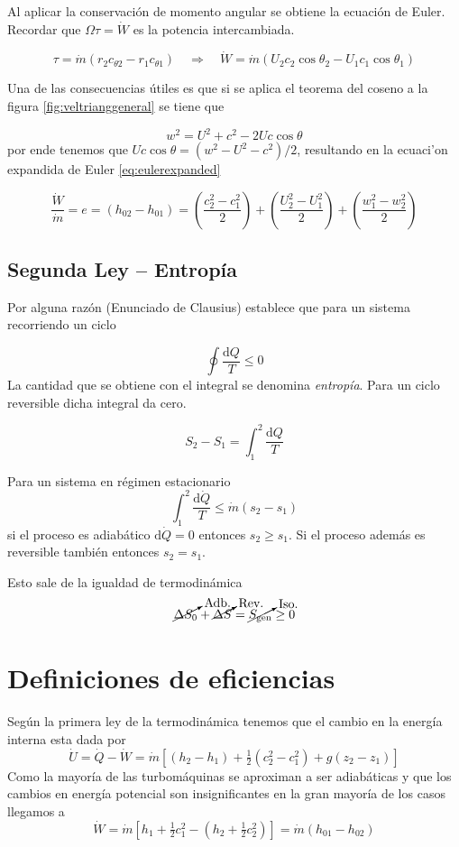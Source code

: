 \documentclass{article}
\newcommand{\substy}[2]{\ensuremath{{#1_{\mathrm{#2}}}}}
\newcommand{\ctan}[1]{\ensuremath{c_{\theta #1}}}
\newcommand{\di}{\textrm{d}}
\newcommand{\Sgen}{\substy{S}{gen}}
\newcommand{\dQ}{\dot{Q}}
\newcommand{\dW}{\dot{W}}
\newcommand{\dm}{\dot{m}}
\begin{document}
Al aplicar la conservación de momento angular se obtiene la ecuación de Euler. Recordar que $\Omega \tau = \dW$ es la potencia intercambiada.

\begin{equation}\label{eq:eulerparaTubomaquinas}
    \tau= \dot{m} (r_2\ctan{2} -r_1 \ctan{1})  \quad \Rightarrow\quad \dW =\dm (U_2 c_2 \cos \theta_2 - U_1 c_1 \cos \theta_1)  
\end{equation}

Una de las consecuencias útiles es que si se aplica el teorema del coseno a la figura \ref{fig:veltrianggeneral} se tiene que

\[
w^2 = U^2 +c^2 -2U c \cos \theta 
\]
por ende tenemos que $Uc \cos \theta = (w^2-U^2-c^2)/2$, resultando en la ecuaci'on expandida de Euler \ref{eq:eulerexpanded}

\begin{equation} \label{eq:eulerexpanded}
    \frac{\dot{W}}{\dot{m}}=e=(h_{02}-h_{01})= \left(\frac{c_2^2-c_1^2}{2}\right)+\left(\frac{U_2^2-U_1^2}{2}\right)+\left(\frac{w_1^2-w_2^2}{2}\right)
\end{equation}





\subsection{Segunda Ley -- Entropía}
Por alguna razón (Enunciado de Clausius) establece que para un sistema recorriendo un ciclo

\[
\oint \frac{\di Q}{T} \leq 0
\]
La cantidad que se obtiene con el integral se denomina \textit{entropía}. Para un ciclo reversible dicha integral da cero.

\[
S_2 - S_1 = \int^2_1 \frac{\di Q}{T}
\]

Para un sistema en régimen estacionario
\[
\int^2_1 \frac{\di\dot{Q}}{T} \leq \dot{m}(s_2 -s_1)
\]
si el proceso es adiabático $\di \dot{Q}=0$ entonces $s_2\geq s_1$.  Si el proceso además es reversible también entonces $s_2 =s_1$.

Esto sale de la igualdad de termodinámica
\[
\cancelto{\textrm{Adb.}}{\Delta S_0} + \cancelto{\textrm{Rev.}}{\Delta S} = \cancelto{\textrm{Iso.}}{\Sgen} \geq 0
\]

\section{Definiciones de eficiencias}
Según la primera ley de la termodinámica tenemos que el cambio en la energía interna esta dada por
\begin{equation}
    \dot{U} =\dQ -\dW = \dm \left[(h_2-h_1)+\tfrac{1}{2}(c_2^2-c_1^2)+g(z_2-z_1) \right]
\end{equation}
Como la mayoría de las turbomáquinas se aproximan a ser adiabáticas y que los cambios en energía potencial son insignificantes en la gran mayoría de los casos llegamos a
\begin{equation}
    \dW = \dm \left[ h_1+\tfrac{1}{2}c_1^2 - (h_2+\tfrac{1}{2}c_2^2) \right] = \dm \left( h_{01}-h_{02}\right)
\end{equation}
\end{document}
